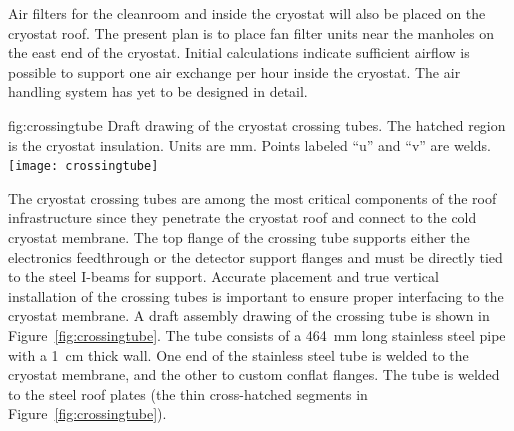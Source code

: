 Air filters for the cleanroom and inside the cryostat will also be placed on the cryostat roof. The present plan is to place fan filter units near the manholes on the east end of the cryostat. Initial calculations indicate sufficient airflow is possible to support one air exchange per hour inside the cryostat. The air handling system has yet to be designed in detail.


\begin{dunefigure}{fig:crossingtube}
  {Draft drawing of the cryostat crossing tubes. The hatched region is the cryostat insulation. Units are mm. Points labeled ``u'' and ``v'' are welds. }
\texttt{[image: crossingtube]}
\end{dunefigure}
 
The cryostat crossing tubes are among the most critical components of the roof infrastructure since  %
they penetrate the cryostat roof and connect to the cold cryostat membrane. The top flange of the crossing tube supports either the electronics feedthrough or the detector support flanges and must be directly tied to the steel I-beams for support. %
Accurate placement and true vertical installation of the crossing tubes is important to ensure proper interfacing to the cryostat membrane. A draft assembly drawing of the crossing tube is shown in Figure~\ref{fig:crossingtube}. The tube consists of a \SI{464}{mm} long stainless steel pipe with a \SI{1}{cm} thick wall. One end of the stainless steel tube is welded to the cryostat membrane, %
and the other to custom conflat flanges. %
The %
tube is welded to the steel roof plates (the thin cross-hatched segments in Figure~\ref{fig:crossingtube}).  


